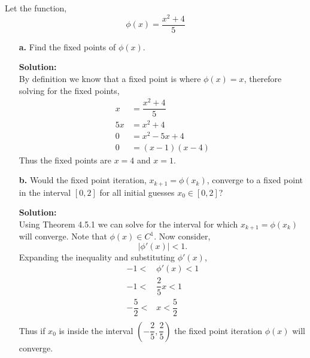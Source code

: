 \documentclass[12pt]{article}
\makeatletter
\theoremstyle{homework}
\newenvironment{exercise}[1]
{\def\@currentlabel{#1}\exercisecore}
{\endexercisecore}
\newcommand{\localhead}[1]{\par\smallskip\noindent\textbf{#1}\nobreak\\}%
\newcommand\solution{\localhead{Solution:}}
\makeatother
\begin{document}
\begin{exercise}{Chapter 4: 12} Let the function,
  \begin{equation*}
    \phi(x) = \dfrac{x^2+4}{5} 
  \end{equation*}
  \begin{enumerate}
    \item[\textbf{a.}] Find the fixed points of $\phi(x)$.\\
     
    \solution By definition we know that a fixed point is where $\phi(x)=x$, therefore solving for the fixed points,
    \begin{align*}
    x &= \dfrac{x^2+4}{5}\\
    5x &= x^2+4\\
    0 &= x^2 - 5x + 4\\
    0 &= (x-1)(x-4)
    \end{align*}
    Thus the fixed points are $x = 4$ and $x = 1$.
    \vspace{.25in} 
    \item[\textbf{b.}] Would the fixed point iteration, $x_{k+1} = \phi(x_k)$, converge to a fixed point in the interval $[0,2]$ 
    for all initial guesses $x_0 \in [0,2]$?\\
    
    \solution  Using Theorem 4.5.1 we can solve for the interval for which $x_{k+1} = \phi(x_k)$ will converge. Note that $\phi(x) \in C^1$. Now consider,
    \begin{equation*}
      |\phi'(x)|<1.
    \end{equation*}
    Expanding the inequality and substituting $\phi'(x)$,
    \begin{align*}
      -1 < &\phi'(x) < 1\\
      -1 < &\dfrac{2}{5}x< 1\\
      -\dfrac{5}{2} < &x < \dfrac{5}{2}\\
    \end{align*}
    Thus if $x_0$ is inside the interval $(-\dfrac{2}{5},\dfrac{2}{5})$ the fixed point iteration $\phi(x)$ will converge.
  \end{enumerate}
\end{exercise}
\end{document}
